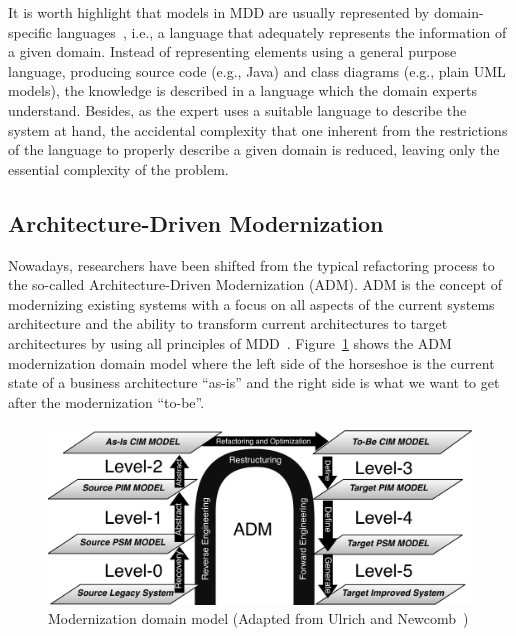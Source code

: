 \documentclass[a4paper,twoside]{article}
\begin{document}
It is worth highlight that models in MDD are usually represented by domain-specific languages~\cite{Fowler:2010:DSL:1809745}, i.e., a language that adequately represents the information of a given domain. Instead of representing elements using a general purpose language, producing source code (e.g., Java) and class diagrams (e.g., plain UML models), the knowledge is described in a language which the domain experts understand. Besides, as the expert uses a suitable language to describe the system at hand, the accidental complexity that one inherent from the restrictions of the language to properly describe a given domain is reduced, leaving only the essential complexity of the problem. 

\subsection{Architecture-Driven Modernization}

Nowadays, researchers have been shifted from the typical refactoring process to the so-called Architecture-Driven Modernization (ADM). ADM is the concept of modernizing existing systems with a focus on all aspects of the current systems architecture and the ability to transform current architectures to target architectures by using all principles of MDD~\cite[p.~60]{Ulrich:2010:IST:1841736}. Figure~\ref{horseshoe} shows the ADM modernization domain model where the left side of the horseshoe is the current state of a business architecture ``as-is'' and the right side is what we want to get after the modernization ``to-be''.


\begin{figure}[!ht]
\centering
  \includegraphics[scale=0.37]{figuras/Fonte_horse_shoe}
\caption{Modernization domain model (Adapted from Ulrich and Newcomb~\cite{Ulrich:2010:IST:1841736})}
\label{horseshoe}
\end{figure}
\end{document}
